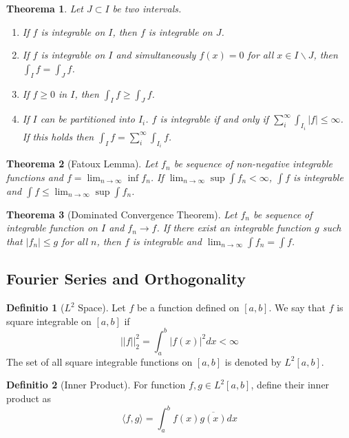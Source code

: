 \documentclass[12pt, a4paper]{article}
\newtheorem{theorem}{Theorema}
\theoremstyle{definition}
\newtheorem{definition}{Definitio}
\theoremstyle{remark}
\begin{document}
\begin{theorem}
Let $J \subset I$ be two intervals.
	\begin{enumerate}
		\item If $f$ is integrable on $I$, then $f$ is integrable on $J$.
		\item If $f$ is integrable on $I$ and simultaneously $f(x) = 0$ for all $x \in I \smallsetminus J $, then $\int_I f = \int_J f$.
		\item If $f \geq 0$ in $I$, then $\int_I f \geq \int_J f$.
		\item If $I$ can be partitioned into $I_i$. $f$ is integrable if and only if $\sum_i^{\infty} \int_{I_i} |f| \leq \infty$. If this holds then $\int_I f = \sum_i^{\infty} \int_{I_i} f$.
	\end{enumerate}
\end{theorem}

\begin{theorem}[Fatoux Lemma]
	Let $f_n$ be sequence of non-negative integrable functions and $f = \lim_{n \rightarrow  \infty} \inf f_n$. If $\lim_{n \rightarrow  \infty} \sup \int f_n < \infty$, $\int f$ is integrable and $\int f \leq \lim_{n \rightarrow  \infty} \sup \int f_n$.
\end{theorem}

\begin{theorem}[Dominated Convergence Theorem] 
	Let $f_n$ be sequence of integrable function on $I$ and $f_n \rightarrow  f$. If there exist an integrable function $g$ such that $|f_n| \leq g$ for all $n$, then $f$ is integrable and $\lim_{n \rightarrow  \infty} \int f_n = \int f$.
\end{theorem}

\subsection{Fourier Series and Orthogonality}

\begin{definition}[$L^2$ Space]
	Let $f$ be a function defined on $[a, b]$. We say that $f$ is square integrable on $[a, b]$ if
	\begin{equation}
		||f||^2_2 = \int_{a}^{b} |f(x)|^2 dx < \infty
	\end{equation}
	The set of all square integrable functions on $[a, b]$ is denoted by $L^2[a, b]$.
\end{definition}

\begin{definition}[Inner Product]
	For function $f,g \in L^2[a,b]$, define their inner product as
	\begin{equation}
		\langle f, g \rangle = \int_{a}^{b} f(x)\overline{g(x)} dx
	\end{equation}
\end{definition}
\end{document}
